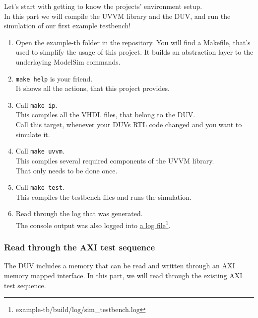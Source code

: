 Let's start with getting to know the projects' environment setup. \\
In this part we will compile the UVVM library and the DUV, and run the simulation of our first example testbench!

\begin{enumerate}
      \item Open the example-tb folder in the repository.
            You will find a Makefile, that's used to simplify the usage of this project. It builds an abstraction layer to the underlaying ModelSim commands.
      \item \texttt{make help} is your friend. \\
            It shows all the actions, that this project provides.
      \item Call \texttt{make ip}. \\
            This compiles all the VHDL files, that belong to the DUV.\\
            Call this target, whenever your DUVs RTL code changed and you want to simulate it.
      \item Call \texttt{make uvvm}. \\
            This compiles several required components of the UVVM library. \\
            That only needs to be done once.
      \item Call \texttt{make test}. \\
            This compiles the testbench files and runs the simulation.
      \item Read through the log that was generated.\\
            The console output was also logged into \href{example-tb/build/log/sim\_testbench.log}{a log file}\footnote{example-tb/build/log/sim\_testbench.log}.
\end{enumerate}

\subsubsection{Read through the AXI test sequence}

The DUV includes a memory that can be read and written through an AXI memory mapped interface. In this part, we will read through the existing AXI test sequence.

